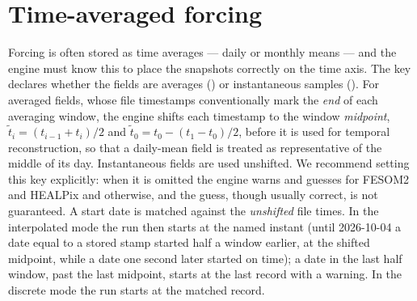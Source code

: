 \section{Time-averaged forcing}\label{sec:input-timeavg}

Forcing is often stored as time averages --- daily or monthly means --- and the engine must know this to place
the snapshots correctly on the time axis. The key  declares whether the fields are
averages () or instantaneous samples (). For averaged fields, whose file timestamps
conventionally mark the \emph{end} of each averaging window, the engine shifts each timestamp to the window
\emph{midpoint}, $\tilde t_i=(t_{i-1}+t_i)/2$ and $\tilde t_0=t_0-(t_1-t_0)/2$, before it is used for temporal
reconstruction, so that a daily-mean field is treated as representative of the middle of its day. Instantaneous
fields are used unshifted. We recommend setting this key explicitly: when it is omitted the engine warns and
guesses  for FESOM2 and HEALPix and  otherwise, and the guess, though usually correct,
is not guaranteed. A start date is matched against the \emph{unshifted} file times. In the interpolated mode
the run then starts at the named instant (until 2026-10-04 a date equal to a stored stamp started half a
window earlier, at the shifted midpoint, while a date one second later started on time); a date in the last
half window, past the last midpoint, starts at the last record with a warning. In the discrete mode the run
starts at the matched record.

